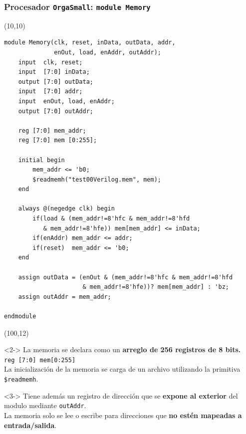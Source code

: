 \documentclass[aspectratio=169]{beamer}
\begin{document}
\begin{frame}[fragile,t]
    \frametitle{Procesador \texttt{OrgaSmall}: \texttt{module Memory}}
    \begin{textblock}{83}(10,10)
\lstset{basicstyle=\tiny}
\begin{lstlisting}
module Memory(clk, reset, inData, outData, addr,
              enOut, load, enAddr, outAddr);
    input  clk, reset;
    input  [7:0] inData;
    output [7:0] outData;
    input  [7:0] addr;
    input  enOut, load, enAddr;
    output [7:0] outAddr;
    
    reg [7:0] mem_addr;
    reg [7:0] mem [0:255];
    
    initial begin
        mem_addr <= 'b0;
        $readmemh("test00Verilog.mem", mem); 
    end
    
    always @(negedge clk) begin
        if(load & (mem_addr!=8'hfc & mem_addr!=8'hfd 
           & mem_addr!=8'hfe)) mem[mem_addr] <= inData;
        if(enAddr) mem_addr <= addr;
        if(reset)  mem_addr <= 'b0;
    end
    
    assign outData = (enOut & (mem_addr!=8'hfc & mem_addr!=8'hfd 
                      & mem_addr!=8'hfe))? mem[mem_addr] : 'bz;
    assign outAddr = mem_addr;
    
endmodule
\end{lstlisting}
    \end{textblock}
    \begin{textblock}{50}(100,12)
    \small
    \begin{onlyenv}<2->
    La memoria se declara como un \textbf{arreglo de 256 registros de 8 bits.}\\ \texttt{reg [7:0] mem[0:255]}\\
    \bigskip
    \textcolor{verdeuca}{La inicialización de la memoria se carga de un archivo utilizando la primitiva \texttt{\$readmemh}.}\\
    \end{onlyenv}
    \bigskip
    \begin{onlyenv}<3->
    Tiene además un registro de dirección que se \textbf{expone al exterior} del modulo mediante \texttt{outAddr}.\\
    \bigskip
    La memoria solo se lee o escribe para direcciones que \textbf{no estén mapeadas a entrada/salida}.
    \end{onlyenv}
    \end{textblock}
\end{frame}
\end{document}
